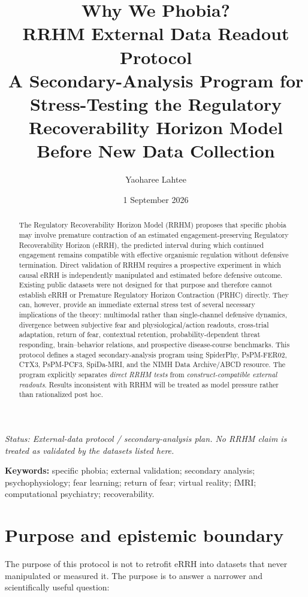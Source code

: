 \documentclass[11pt]{article}
\title{\textbf{Why We Phobia?}\\[0.35em]
\large RRHM External Data Readout Protocol\\[0.2em]
\normalsize A Secondary-Analysis Program for Stress-Testing the Regulatory Recoverability Horizon Model Before New Data Collection}
\author{Yaoharee Lahtee}
\date{1 September 2026}
\begin{document}
\maketitle

\begin{center}
\textit{Status: External-data protocol / secondary-analysis plan. No RRHM claim is treated as validated by the datasets listed here.}
\end{center}

\begin{abstract}
The Regulatory Recoverability Horizon Model (RRHM) proposes that specific phobia may involve premature contraction of an estimated engagement-preserving Regulatory Recoverability Horizon (eRRH), the predicted interval during which continued engagement remains compatible with effective organismic regulation without defensive termination. Direct validation of RRHM requires a prospective experiment in which causal eRRH is independently manipulated and estimated before defensive outcome. Existing public datasets were not designed for that purpose and therefore cannot establish eRRH or Premature Regulatory Horizon Contraction (PRHC) directly. They can, however, provide an immediate external stress test of several necessary implications of the theory: multimodal rather than single-channel defensive dynamics, divergence between subjective fear and physiological/action readouts, cross-trial adaptation, return of fear, contextual retention, probability-dependent threat responding, brain--behavior relations, and prospective disease-course benchmarks. This protocol defines a staged secondary-analysis program using SpiderPhy, PsPM-FER02, CTX3, PsPM-PCF3, SpiDa-MRI, and the NIMH Data Archive/ABCD resource. The program explicitly separates \emph{direct RRHM tests} from \emph{construct-compatible external readouts}. Results inconsistent with RRHM will be treated as model pressure rather than rationalized post hoc.
\end{abstract}

\noindent\textbf{Keywords:} specific phobia; external validation; secondary analysis; psychophysiology; fear learning; return of fear; virtual reality; fMRI; computational psychiatry; recoverability.

\section{Purpose and epistemic boundary}

The purpose of this protocol is not to retrofit eRRH into datasets that never manipulated or measured it. The purpose is to answer a narrower and scientifically useful question:
\end{document}
